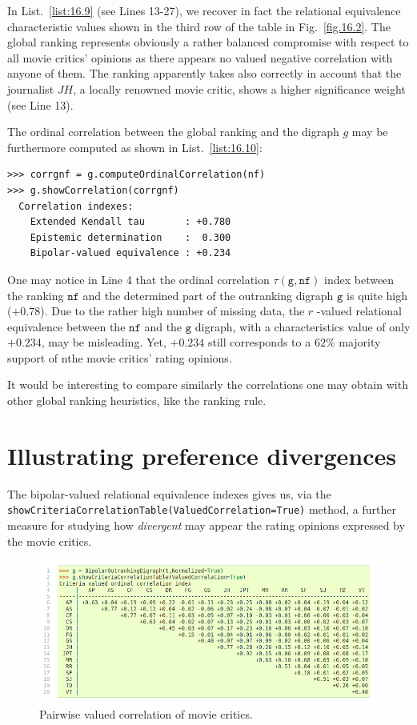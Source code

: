 In List.~\vref{list:16.9} (see Lines 13-27), we recover in fact the relational equivalence characteristic values shown in the third row of the table in Fig.~\vref{fig.16.2}. The global \NetFlows ranking represents obviously a rather balanced compromise with respect to all movie critics' opinions as there appears no valued negative correlation with anyone of them. The \NetFlows ranking apparently takes also correctly in account that the journalist $JH$, a locally renowned movie critic, shows a higher significance weight (see Line 13).

The ordinal correlation between the global \NetFlows ranking and the digraph $g$ may be furthermore computed as shown in List.~\vref{list:16.10}: 
\begin{lstlisting}[caption={Computing correlation between \NetFlows and global outranking},label=list:16.10]
>>> corrgnf = g.computeOrdinalCorrelation(nf)
>>> g.showCorrelation(corrgnf)
  Correlation indexes:
    Extended Kendall tau       : +0.780
    Epistemic determination    :  0.300
    Bipolar-valued equivalence : +0.234
\end{lstlisting}
One may notice in Line 4 that the ordinal correlation $\tau(\mathtt{g},\mathtt{nf})$ index between the \NetFlows ranking $\mathtt{nf}$ and the determined part of the outranking digraph $\mathtt{g}$ is quite high ($+0.78$). Due to the rather high number of missing data, the $r$ -valued relational equivalence between the $\mathtt{nf}$ and the $\mathtt{g}$ digraph, with a characteristics value of only $+0.234$, may be misleading. Yet, $+0.234$ still corresponds to a $62\%$ majority support of nthe movie critics' rating opinions.

It would be interesting to compare similarly the correlations one may obtain with other global ranking heuristics, like the \Copeland ranking rule.

\section{Illustrating preference divergences}
\label{sec:16.4}

The bipolar-valued relational equivalence indexes gives us, via the \texttt{showCriteriaCorrelationTable(ValuedCorrelation=True)} method, a further measure for studying how \emph{divergent} may appear the rating opinions expressed by the movie critics. 
\begin{figure}[h]
\includegraphics[width=12cm]{Figures/correlationTable.png}
\caption{Pairwise valued correlation of movie critics.} 
\label{fig:16.6}       %
\end{figure}

